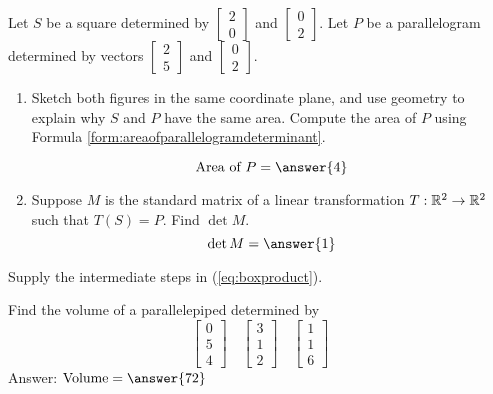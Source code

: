 \documentclass{ximera}
\begin{document}
    \begin{problem}\label{prob:areasquareandparal} Let $S$ be a square determined by $\begin{bmatrix}2\\0\end{bmatrix}$ and $\begin{bmatrix}0\\2\end{bmatrix}$.  Let $P$ be a parallelogram determined by vectors $\begin{bmatrix}2\\5\end{bmatrix}$ and $\begin{bmatrix}0\\2\end{bmatrix}$. 
    \begin{enumerate}
    \item Sketch both figures in the same coordinate plane, and use geometry to explain why $S$ and $P$ have the same area.  Compute the area of $P$ using Formula \ref{form:areaofparallelogramdeterminant}.
     
    $$\text{Area of }P=\answer{4}$$
    \item Suppose $M$ is the standard matrix of a linear transformation $T:\mathbb{R}^2\rightarrow\mathbb{R}^2$ such that $T(S)=P$.  Find $\det M$.
    $$\det M=\answer{1}$$
    \end{enumerate}
    \end{problem}
     
    \begin{problem}\label{prob:boxprductproof}
    Supply the intermediate steps in (\ref{eq:boxproduct}).
    \end{problem}
     
    \begin{problem}\label{prob:volparallelepiped}
    Find the volume of a parallelepiped determined by
    $$\begin{bmatrix}0\\5\\4\end{bmatrix}\quad\begin{bmatrix}3\\1\\2\end{bmatrix}\quad\begin{bmatrix}1\\1\\6\end{bmatrix}$$
    Answer: $\mbox{Volume}=\answer{72}$
    \end{problem}
     
\end{document}
